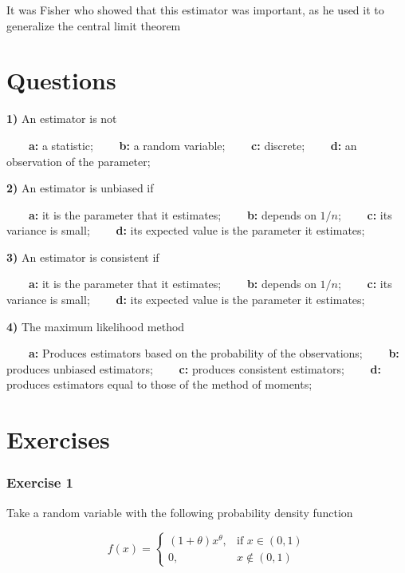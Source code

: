 \documentclass[
]{book}
\begin{document}
It was Fisher who showed that this estimator was important, as he used it to generalize the central limit theorem

\hypertarget{questions-9}{%
\section{Questions}\label{questions-9}}

\textbf{1)} An estimator is not

\textbf{\(\qquad\)a:} a statistic;
\textbf{\(\qquad\)b:} a random variable;
\textbf{\(\qquad\)c:} discrete;
\textbf{\(\qquad\)d:} an observation of the parameter;

\textbf{2)} An estimator is unbiased if

\textbf{\(\qquad\)a:} it is the parameter that it estimates;
\textbf{\(\qquad\)b:} depends on \(1/n\);
\textbf{\(\qquad\)c:} its variance is small;
\textbf{\(\qquad\)d:} its expected value is the parameter it estimates;

\textbf{3)} An estimator is consistent if

\textbf{\(\qquad\)a:} it is the parameter that it estimates;
\textbf{\(\qquad\)b:} depends on \(1/n\);
\textbf{\(\qquad\)c:} its variance is small;
\textbf{\(\qquad\)d:} its expected value is the parameter it estimates;

\textbf{4)} The maximum likelihood method

\textbf{\(\qquad\)a:} Produces estimators based on the probability of the observations;
\textbf{\(\qquad\)b:} produces unbiased estimators;
\textbf{\(\qquad\)c:} produces consistent estimators;
\textbf{\(\qquad\)d:} produces estimators equal to those of the method of moments;

\hypertarget{exercises-10}{%
\section{Exercises}\label{exercises-10}}

\hypertarget{exercise-1-9}{%
\subsubsection{Exercise 1}\label{exercise-1-9}}

Take a random variable with the following probability density function

\[
f(x)=
\begin{cases}
    (1+\theta)x^\theta,& \text{if } x\in (0,1)\\
    0,&  x\notin (0,1)
\end{cases}
\]
\end{document}
